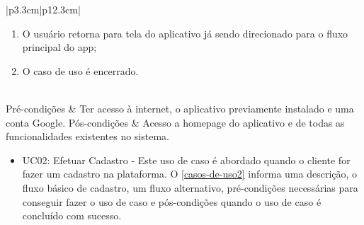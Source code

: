 \begin{apendicesenv}
\begin{longtable}{|p{3.3cm}|p{12.3cm}|}
\begin{enumerate}
		\item O usuário retorna para tela do aplicativo já sendo direcionado para o fluxo principal do app;
		\item O caso de uso é encerrado. 
	\end{enumerate} \\
	\hline
	Pré-condições & Ter acesso à internet, o aplicativo previamente instalado e uma conta Google.
	\hline
	Pós-condições & Acesso a homepage do aplicativo e de todas as funcionalidades existentes no sistema. \\
	\hline
\end{longtable}



\begin{itemize}
	\item UC02: Efetuar Cadastro - Este uso de caso é abordado quando o cliente for fazer um cadastro na plataforma. O 	\autoref{casos-de-uso2} informa uma descrição, o fluxo básico de cadastro, um fluxo alternativo, pré-condições necessárias para conseguir fazer o uso de caso e pós-condições quando o uso de caso é concluído com sucesso. \\
\end{itemize}



\end{apendicesenv}

